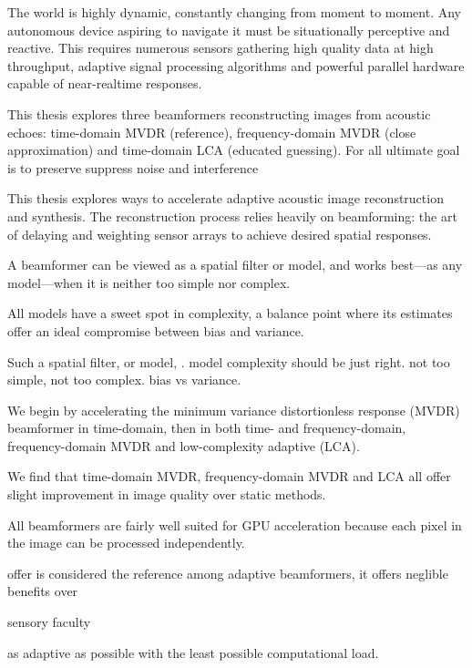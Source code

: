 
The world is highly dynamic, constantly changing from moment to moment. Any autonomous device aspiring to navigate it must be situationally perceptive and reactive. This requires numerous sensors gathering high quality data at high throughput, adaptive signal processing algorithms and powerful parallel hardware capable of near-realtime responses.



This thesis explores three beamformers reconstructing images from acoustic echoes: time-domain MVDR (reference), frequency-domain MVDR (close approximation) and time-domain LCA (educated guessing). For all ultimate goal is to preserve suppress noise and interference 


This thesis explores ways to accelerate adaptive acoustic image reconstruction and synthesis. The reconstruction process relies heavily on beamforming: the art of delaying and weighting sensor arrays to achieve desired spatial responses. 

A beamformer can be viewed as a spatial filter or model, and works best---as any model---when it is neither too simple nor complex. 

All models have a sweet spot in complexity, a balance point where its estimates offer an ideal compromise between bias and variance. 

Such a spatial filter, or model, . model complexity should be just right. not too simple, not too complex. bias vs variance. 

We begin by accelerating the minimum variance distortionless response (MVDR) beamformer in time-domain, then  in both time- and frequency-domain, frequency-domain MVDR and low-complexity adaptive (LCA). 

We find that time-domain MVDR, frequency-domain MVDR and LCA all offer slight improvement in image quality over static methods. 

All beamformers are fairly well suited for GPU acceleration because each pixel in the image can be processed independently.

 offer is considered the reference among adaptive beamformers, it offers neglible benefits over 

sensory faculty

as adaptive as possible with the least possible computational load.




